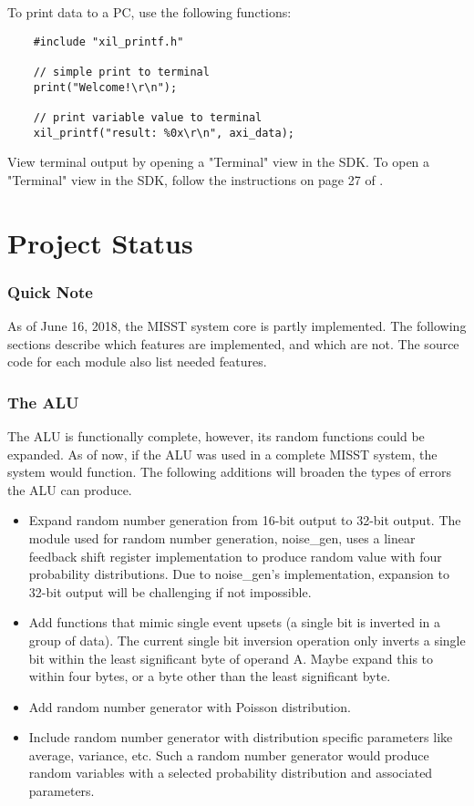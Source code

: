 \documentclass[]{report}
\begin{document}
To print data to a PC, use the following functions:
\begin{verbatim}
	#include "xil_printf.h"
	
	// simple print to terminal
    print("Welcome!\r\n");

	// print variable value to terminal
	xil_printf("result: %0x\r\n", axi_data);
\end{verbatim}

View terminal output by opening a "Terminal" view in the SDK. To open a "Terminal" view in the SDK, follow the instructions on page 27 of \cite{ug zynq embedded design}.

\part{Project Status}

\section*{Quick Note}
As of June 16, 2018, the MISST system core is partly implemented. The following sections describe which features are implemented, and which are not. The source code for each module also list needed features. 

\section{The ALU}
The ALU is functionally complete, however, its random functions could be expanded. As of now, if the ALU was used in a complete MISST system, the system would function. The following additions will broaden the types of errors the ALU can produce.
\begin{itemize}
	\item Expand random number generation from 16-bit output to 32-bit output. The module used for random number generation, noise\_gen, uses a linear feedback shift register implementation to produce random value with four probability distributions. Due to noise\_gen's implementation, expansion to 32-bit output will be challenging if not impossible.
	\item Add functions that mimic single event upsets (a single bit is inverted in a group of data). The current single bit inversion operation only inverts a single bit within the least significant byte of operand A. Maybe expand this to within four bytes, or a byte other than the least significant byte.
	\item Add random number generator with Poisson distribution.
	\item Include random number generator with distribution specific parameters like average, variance, etc. Such a random number generator would produce random variables with a selected probability distribution and associated parameters.
\end{itemize}
\end{document}
